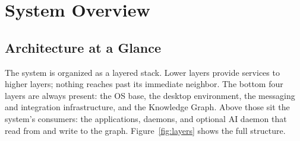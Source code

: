 \section{System Overview}
\label{sec:overview}

\subsection{Architecture at a Glance}
\label{sec:arch-glance}

The system is organized as a layered stack. Lower layers provide services to
higher layers; nothing reaches past its immediate neighbor. The bottom four
layers are always present: the OS base, the desktop environment, the messaging
and integration infrastructure, and the Knowledge Graph. Above those sit the
system's consumers: the applications, daemons, and optional AI daemon that
read from and write to the graph. Figure~\ref{fig:layers} shows the full
structure.

